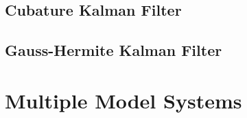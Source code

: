 


























\subsection{Cubature Kalman Filter}














\subsection{Gauss-Hermite Kalman Filter}


















\section{Multiple Model Systems}



